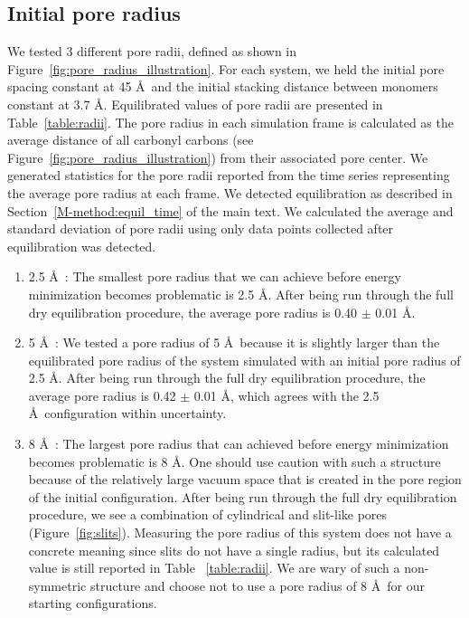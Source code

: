\documentclass{article}
\begin{document}
  \subsection{Initial pore radius}\label{section:initial_pore_radius}

  We tested 3 different pore radii, defined as shown in
  Figure~\ref{fig:pore_radius_illustration}. For each system, we held the initial
  pore spacing constant at 45 \AA~and the initial stacking distance between monomers
  constant at 3.7 \AA. Equilibrated values of pore radii are presented in
  Table~\ref{table:radii}. The pore radius in each simulation frame is calculated
  as the average distance of all carbonyl carbons (see
  Figure~\ref{fig:pore_radius_illustration}) from their associated pore center.
  We generated statistics for the pore radii reported from the time series
  representing the average pore radius at each frame. We detected equilibration
  as described in Section~\ref{M-method:equil_time} of the main text. We 
  calculated the average and standard deviation of pore radii using only data 
  points collected after equilibration was detected.

  \begin{enumerate}

  \item 2.5 \AA~: The smallest pore radius that we can achieve
  before energy minimization becomes problematic is 2.5 \AA. After being run
  through the full dry equilibration procedure, the average pore radius is 0.40
  $\pm$ 0.01 \AA.

  \item 5 \AA~: We tested a pore radius of 5 \AA~because it is
  slightly larger than the equilibrated pore radius of the system simulated with
  an initial pore radius of 2.5 \AA. After being run through the full dry
  equilibration procedure, the average pore radius is 0.42 $\pm$ 0.01 \AA, which
  agrees with the 2.5 \AA~configuration within uncertainty. 

  \item 8 \AA~: The largest pore radius that can achieved before
  energy minimization becomes problematic is 8 \AA. One should use caution with
  such a structure because of the relatively large vacuum space that is created
  in the pore region of the initial configuration. After being run through the
  full dry equilibration procedure, we see a combination of cylindrical and
  slit-like pores (Figure~\ref{fig:slits}). Measuring the pore radius of this
  system does not have a concrete meaning since slits do not have a single
  radius, but its calculated value is still reported in Table ~\ref{table:radii}. We
  are wary of such a non-symmetric structure and choose not to use a pore radius
  of 8 \AA~for our starting configurations. 
  
  \end{enumerate}
\end{document}

